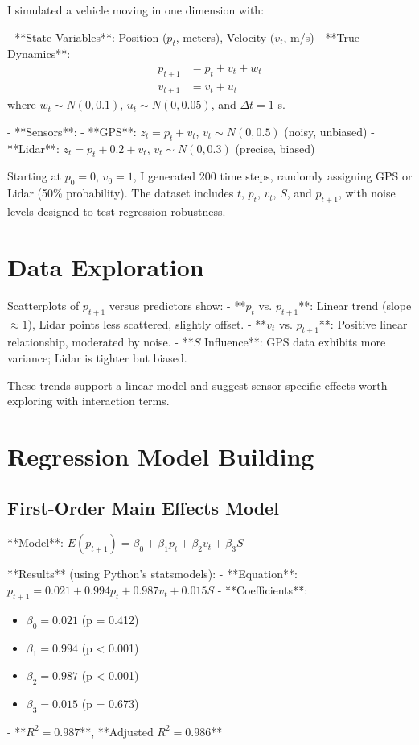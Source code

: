 \documentclass[12pt]{article}
\begin{document}
I simulated a vehicle moving in one dimension with:

- **State Variables**: Position (\( p_t \), meters), Velocity (\( v_t \), m/s)
- **True Dynamics**:
  \begin{align}
    p_{t+1} &= p_t + v_t + w_t \label{eq:sim_position} \\
    v_{t+1} &= v_t + u_t \label{eq:sim_velocity}
  \end{align}
  where \( w_t \sim N(0, 0.1) \), \( u_t \sim N(0, 0.05) \), and \( \Delta t = 1 \) s.

- **Sensors**:
  - **GPS**: \( z_t = p_t + v_t \), \( v_t \sim N(0, 0.5) \) (noisy, unbiased)
  - **Lidar**: \( z_t = p_t + 0.2 + v_t \), \( v_t \sim N(0, 0.3) \) (precise, biased)

Starting at \( p_0 = 0 \), \( v_0 = 1 \), I generated 200 time steps, randomly assigning GPS or Lidar (50\% probability). The dataset includes \( t \), \( p_t \), \( v_t \), \( S \), and \( p_{t+1} \), with noise levels designed to test regression robustness.

\section{Data Exploration}
\label{sec:data_exploration}

Scatterplots of \( p_{t+1} \) versus predictors show:
- **\( p_t \) vs. \( p_{t+1} \)**: Linear trend (slope \(\approx 1\)), Lidar points less scattered, slightly offset.
- **\( v_t \) vs. \( p_{t+1} \)**: Positive linear relationship, moderated by noise.
- **\( S \) Influence**: GPS data exhibits more variance; Lidar is tighter but biased.

These trends support a linear model and suggest sensor-specific effects worth exploring with interaction terms.

\section{Regression Model Building}
\label{sec:regression_model_building}

\subsection{First-Order Main Effects Model}
\label{subsec:first_order_main_effects}

**Model**: \( E(p_{t+1}) = \beta_0 + \beta_1 p_t + \beta_2 v_t + \beta_3 S \)

**Results** (using Python’s statsmodels):
- **Equation**: \( p_{t+1} = 0.021 + 0.994 p_t + 0.987 v_t + 0.015 S \)
- **Coefficients**:
  \begin{itemize}
    \item \( \beta_0 = 0.021 \) (p = 0.412)
    \item \( \beta_1 = 0.994 \) (p < 0.001)
    \item \( \beta_2 = 0.987 \) (p < 0.001)
    \item \( \beta_3 = 0.015 \) (p = 0.673)
  \end{itemize}
- **\( R^2 = 0.987 \)**, **Adjusted \( R^2 = 0.986 \)**
\end{document}
